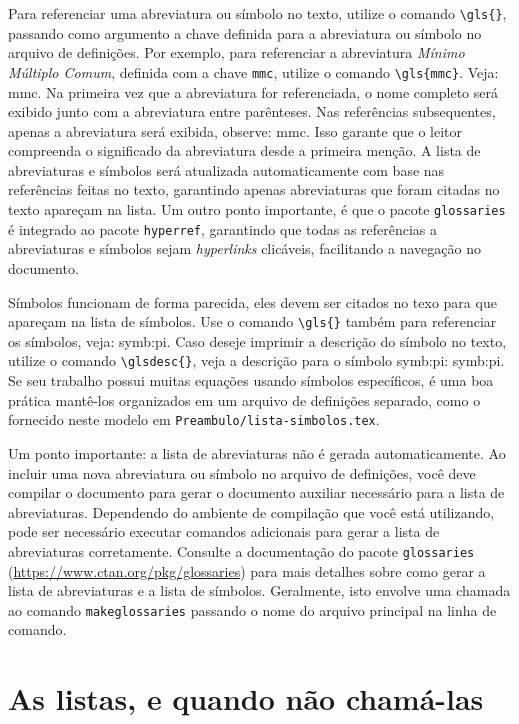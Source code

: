 Para referenciar uma abreviatura ou símbolo no texto, utilize o comando \verb|\gls{}|, passando como
argumento a chave definida para a abreviatura ou símbolo no arquivo de definições. Por exemplo, para
referenciar a abreviatura \emph{Mínimo Múltiplo Comum}, definida com a chave \texttt{mmc}, utilize o
comando \verb|\gls{mmc}|. Veja: \gls{mmc}. Na primeira vez que a abreviatura for referenciada, o
nome completo será exibido junto com a abreviatura entre parênteses. Nas referências subsequentes,
apenas a abreviatura será exibida, observe: \gls{mmc}. Isso garante que o leitor compreenda o
significado da abreviatura desde a primeira menção. A lista de abreviaturas e símbolos será
atualizada automaticamente com base nas referências feitas no texto, garantindo apenas abreviaturas
que foram citadas no texto apareçam na lista. Um outro ponto importante, é que o pacote
\texttt{glossaries} é integrado ao pacote \texttt{hyperref}, garantindo que todas as referências a
abreviaturas e símbolos sejam \emph{hyperlinks} clicáveis, facilitando a navegação no documento.

Símbolos funcionam de forma parecida, eles devem ser citados no texo para que apareçam na lista de
símbolos. Use o comando \verb|\gls{}| também para referenciar os símbolos, veja: \gls{symb:pi}. Caso
deseje imprimir a descrição do símbolo no texto, utilize o comando \verb|\glsdesc{}|, veja a
descrição para o símbolo \gls{symb:pi}: \glsdesc{symb:pi}. Se seu trabalho possui muitas equações
usando símbolos específicos, é uma boa prática mantê-los organizados em um arquivo de definições
separado, como o fornecido neste modelo em \texttt{Preambulo/lista-simbolos.tex}.

Um ponto importante: a lista de abreviaturas não é gerada automaticamente. Ao incluir uma nova
abreviatura ou símbolo no arquivo de definições, você deve compilar o documento para gerar o
documento auxiliar necessário para a lista de abreviaturas. Dependendo do ambiente de compilação que
você está utilizando, pode ser necessário executar comandos adicionais para gerar a lista de
abreviaturas corretamente. Consulte a documentação do pacote \texttt{glossaries}
(\url{https://www.ctan.org/pkg/glossaries}) para mais detalhes sobre como gerar a lista de
abreviaturas e a lista de símbolos. Geralmente, isto envolve uma chamada ao comando
\texttt{makeglossaries} passando o nome do arquivo principal na linha de comando.

\section{As listas, e quando não chamá-las}\label{sec:listas}

